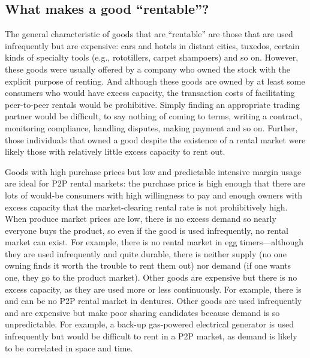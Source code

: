 \documentclass[11pt]{article}
\begin{document}
\subsection{What makes a good ``rentable''?} 
The general characteristic of goods that are ``rentable'' are those that are used infrequently but are expensive: 
cars and hotels in distant cities, tuxedos, certain kinds of specialty tools (e.g., rototillers, carpet shampoers) and so on. 
However, these goods were usually offered by a company who owned the stock with the explicit purpose of renting.  
And although these goods are owned by at least some consumers who would have excess capacity, the transaction costs of facilitating peer-to-peer rentals would be prohibitive. 
Simply finding an appropriate trading partner would be difficult, to say nothing of coming to terms, writing a contract, monitoring compliance, handling disputes, making payment and so on. 
Further, those individuals that owned a good despite the existence of a rental market were likely those with relatively little excess capacity to rent out. 

Goods with high purchase prices but low and predictable intensive margin usage are ideal for P2P rental markets: 
the purchase price is high enough that there are lots of would-be consumers with high willingness to pay and enough owners with excess capacity that the market-clearing rental rate is not prohibitively high. 
When produce market prices are low, there is no excess demand so nearly everyone buys the product, so even if the good is used infrequently, no rental market can exist.  
For example, there is no rental market in egg timers---although they are used infrequently and quite durable, there is neither supply (no one owning finds it worth the trouble to rent them out) nor demand (if one wants one, they go to the product market). 
Other goods are expensive but there is no excess capacity, as they are used more or less continuously. 
For example, there is and can be no P2P rental market in dentures. 
Other goods are used infrequently and are expensive but make poor sharing candidates because demand is so unpredictable. 
For example, a back-up gas-powered electrical generator is used infrequently but would be difficult to rent in a P2P market, as demand is likely to be correlated in space and time. 
\end{document}
